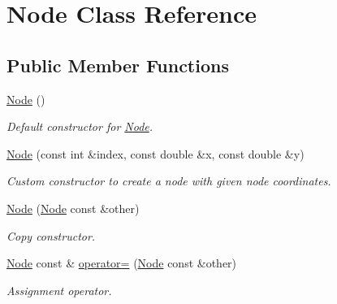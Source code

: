 \hypertarget{class_node}{}\section{Node Class Reference}
\label{class_node}
\subsection*{Public Member Functions}
\begin{DoxyCompactItemize}
\item 
\mbox{\label{class_node_ad7a34779cad45d997bfd6d3d8043c75f}} 
\mbox{\hyperlink{class_node_ad7a34779cad45d997bfd6d3d8043c75f}{Node}} ()
\begin{DoxyCompactList}\small\item\em Default constructor for \mbox{\hyperlink{class_node}{Node}}. \end{DoxyCompactList}\item 
\mbox{\hyperlink{class_node_a7dd5e46921c9aa573f8167e1f3d0acaa}{Node}} (const int \&index, const double \&x, const double \&y)
\begin{DoxyCompactList}\small\item\em Custom constructor to create a node with given node coordinates. \end{DoxyCompactList}\item 
\mbox{\label{class_node_aef463e59f7af71d83b6392089c27bcba}} 
\mbox{\hyperlink{class_node_aef463e59f7af71d83b6392089c27bcba}{Node}} (\mbox{\hyperlink{class_node}{Node}} const \&other)
\begin{DoxyCompactList}\small\item\em Copy constructor. \end{DoxyCompactList}\item 
\mbox{\label{class_node_a0abaefd98651b6cdba055d4644360170}} 
\mbox{\hyperlink{class_node}{Node}} const  \& \mbox{\hyperlink{class_node_a0abaefd98651b6cdba055d4644360170}{operator=}} (\mbox{\hyperlink{class_node}{Node}} const \&other)
\begin{DoxyCompactList}\small\item\em Assignment operator. \end{DoxyCompactList}\item 
\mbox{\label{class_node_aa0840c3cb5c7159be6d992adecd2097c}} 

\end{DoxyCompactItemize}

